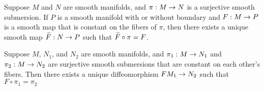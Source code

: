 \begin{thm}
Suppose $M$ and $N$ are smooth manifolds, and $\pi:M\rightarrow N$ is a surjective smooth submersion. If $P$ is a smooth manifold with or without boundary and $F:M\rightarrow P$ is a smooth map that is constant on the fibers of $\pi$, then there exists a unique smooth map $\widetilde F:N\rightarrow P$ such that $\widetilde F\circ \pi = F$.
\end{thm}

\begin{thm}
Suppose $M$, $N_1$, and $N_2$ are smooth manifolds, and $\pi_1:M\rightarrow N_1$ and $\pi_2:M\rightarrow N_2$ are surjective smooth submersions that are constant on each other's fibers. Then there exists a unique diffeomorphism $FM_1\rightarrow N_2$ such that $F\circ \pi_1 = \pi_2$
\begin{center}
\end{center}
\end{thm}
